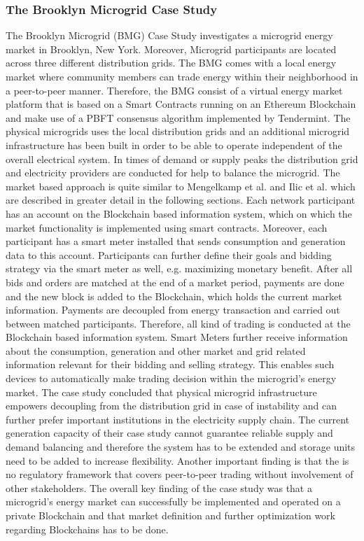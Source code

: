 \documentclass[runningheads]{llncs}
\begin{document}
\subsubsection{The Brooklyn Microgrid Case Study} 
The Brooklyn Microgrid (BMG) Case Study investigates a microgrid energy market in Brooklyn, New York. Moreover, Microgrid participants are located across three different distribution grids. The BMG comes with a local energy market where community members can trade energy within their neighborhood in a peer-to-peer manner. \newline
Therefore, the BMG consist of a virtual energy market platform that is based on a Smart Contracts running on an Ethereum Blockchain and make use of a PBFT consensus algorithm implemented by Tendermint. The physical microgrids uses the local distribution grids and an additional microgrid infrastructure has been built in order to be able to operate independent of the overall electrical system. In times of demand or supply peaks the distribution grid and electricity providers are conducted for help to balance the microgrid. \cite{brooklyn_microgrid} \newline
The market based approach is quite similar to Mengelkamp et al. \cite{mengelkamp_lem} and Ilic et al. \cite{ilic_smart_grid_neighbourhoods} which are described in greater detail in the following sections. Each network participant has an account on the Blockchain based information system, which on which the market functionality is implemented using smart contracts. Moreover, each participant has a smart meter installed that sends consumption and generation data to this account. Participants can further define their goals and bidding strategy via the smart meter as well, e.g. maximizing monetary benefit. After all bids and orders are matched at the end of a market period, payments are done and the new block is added to the Blockchain, which holds the current market information. Payments are decoupled from energy transaction and carried out between matched participants. Therefore, all kind of trading is conducted at the Blockchain based information system. Smart Meters further receive information about the consumption, generation and other market and grid related information relevant for their bidding and selling strategy. This enables such devices to automatically make trading decision within the microgrid’s energy market. \newline
The case study \cite{brooklyn_microgrid} concluded that physical microgrid infrastructure empowers decoupling from the distribution grid in case of instability and can further prefer important institutions in the electricity supply chain. The current generation capacity of their case study cannot guarantee reliable supply and demand balancing and therefore the system has to be extended and storage units need to be added to increase flexibility. Another important finding is that the is no regulatory framework that covers peer-to-peer trading without involvement of other stakeholders. The overall key finding of the case study was that a microgrid’s energy market can successfully be implemented and operated on a private Blockchain and that market definition and further optimization work regarding Blockchains has to be done.
\end{document}
